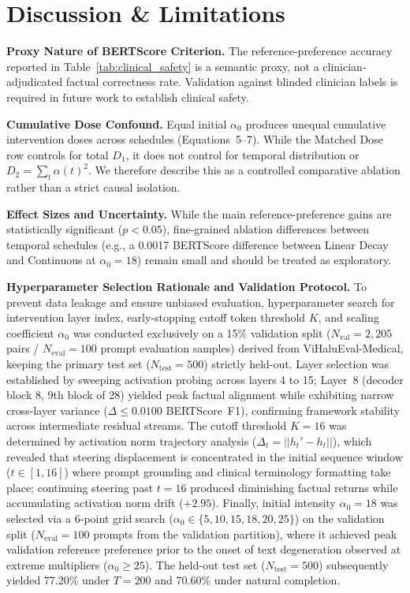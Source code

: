 \documentclass[conference]{IEEEtran}
\begin{document}
\section{Discussion \& Limitations}

\textbf{Proxy Nature of BERTScore Criterion.} The reference-preference accuracy reported in Table~\ref{tab:clinical_safety} is a semantic proxy, not a clinician-adjudicated factual correctness rate. Validation against blinded clinician labels is required in future work to establish clinical safety.

\textbf{Cumulative Dose Confound.} Equal initial $\alpha_0$ produces unequal cumulative intervention doses across schedules (Equations~5--7). While the Matched Dose row controls for total $D_1$, it does not control for temporal distribution or $D_2 = \sum_t \alpha(t)^2$. We therefore describe this as a controlled comparative ablation rather than a strict causal isolation.

\textbf{Effect Sizes and Uncertainty.} While the main reference-preference gains are statistically significant ($p < 0.05$), fine-grained ablation differences between temporal schedules (e.g., a 0.0017 BERTScore difference between Linear Decay and Continuous at $\alpha_0=18$) remain small and should be treated as exploratory.

\textbf{Hyperparameter Selection Rationale and Validation Protocol.} To prevent data leakage and ensure unbiased evaluation, hyperparameter search for intervention layer index, early-stopping cutoff token threshold $K$, and scaling coefficient $\alpha_0$ was conducted exclusively on a 15\% validation split ($N_{\text{val}} = 2,205$ pairs / $N_{\text{eval}}=100$ prompt evaluation samples) derived from ViHaluEval-Medical, keeping the primary test set ($N_{\text{test}}=500$) strictly held-out. Layer selection was established by sweeping activation probing across layers 4 to 15; Layer~8 (decoder block 8, 9th block of 28) yielded peak factual alignment while exhibiting narrow cross-layer variance ($\Delta \le 0.0100$ BERTScore~F1), confirming framework stability across intermediate residual streams. The cutoff threshold $K=16$ was determined by activation norm trajectory analysis ($\Delta_t = ||h_t' - h_t||$), which revealed that steering displacement is concentrated in the initial sequence window ($t \in [1, 16]$) where prompt grounding and clinical terminology formatting take place; continuing steering past $t=16$ produced diminishing factual returns while accumulating activation norm drift ($+2.95$). Finally, initial intensity $\alpha_0=18$ was selected via a 6-point grid search ($\alpha_0 \in \{5, 10, 15, 18, 20, 25\}$) on the validation split ($N_{\text{eval}}=100$ prompts from the validation partition), where it achieved peak validation reference preference prior to the onset of text degeneration observed at extreme multipliers ($\alpha_0 \ge 25$). The held-out test set ($N_{\text{test}}=500$) subsequently yielded 77.20\% under $T=200$ and 70.60\% under natural completion.
\end{document}
